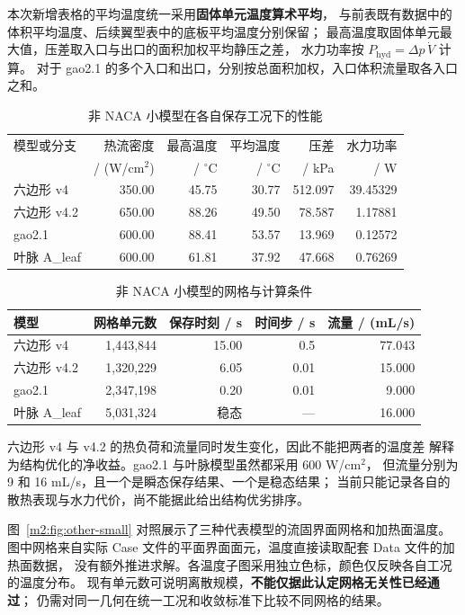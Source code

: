 \documentclass[UTF8]{midterm}
\begin{document}
本次新增表格的平均温度统一采用\textbf{固体单元温度算术平均}，
与前表既有数据中的体积平均温度、后续翼型表中的底板平均温度分别保留；
最高温度取固体单元最大值，压差取入口与出口的面积加权平均静压之差，
水力功率按 $P_{\mathrm{hyd}}=\Delta p\,\dot V$ 计算。
对于 gao2.1 的多个入口和出口，分别按总面积加权，入口体积流量取各入口之和。
\begin{table}[!htbp]
\centering
\small
\caption{非 NACA 小模型在各自保存工况下的性能}
\label{m2:tab:other-small}
\begin{tabularx}{\textwidth}{@{}Y r r r r r@{}}
\toprule
{} 模型或分支 & 热流密度 & 最高温度 & 平均温度 & 压差 & 水力功率 \\
 & / (W/cm$^2$) & / $^\circ$C & / $^\circ$C & / kPa & / W \\
\midrule
六边形 v4 & 350.00 & 45.75 & 30.77 & 512.097 & 39.45329 \\
六边形 v4.2 & 650.00 & 88.26 & 49.50 & 78.587 & 1.17881 \\
gao2.1 & 600.00 & 88.41 & 53.57 & 13.969 & 0.12572 \\
叶脉 A\_leaf & 600.00 & 61.81 & 37.92 & 47.668 & 0.76269 \\
\bottomrule
\end{tabularx}
\end{table}

\begin{table}[!htbp]
\centering
\small
\caption{非 NACA 小模型的网格与计算条件}
\label{m2:tab:other-conditions}
\begin{tabularx}{\textwidth}{@{}Y r r r r@{}}
\toprule
{} 模型 & 网格单元数 & 保存时刻 / s & 时间步 / s & 流量 / (mL/s) \\
\midrule
六边形 v4 & 1,443,844 & 15.00 & 0.5 & 77.043 \\
六边形 v4.2 & 1,320,229 & 6.05 & 0.01 & 15.000 \\
gao2.1 & 2,347,198 & 0.20 & 0.01 & 9.000 \\
叶脉 A\_leaf & 5,031,324 & 稳态 & --- & 16.000 \\
\bottomrule
\end{tabularx}
\end{table}

六边形 v4 与 v4.2 的热负荷和流量同时发生变化，因此不能把两者的温度差
解释为结构优化的净收益。gao2.1 与叶脉模型虽然都采用 600 W/cm$^2$，
但流量分别为 9 和 16 mL/s，且一个是瞬态保存结果、一个是稳态结果；
当前只能记录各自的散热表现与水力代价，尚不能据此给出结构优劣排序。

图~\ref{m2:fig:other-small} 对照展示了三种代表模型的流固界面网格和加热面温度。
图中网格来自实际 Case 文件的平面界面面元，温度直接读取配套 Data 文件的加热面数据，
没有额外推进求解。各温度子图采用独立色标，颜色仅反映各自工况的温度分布。
现有单元数可说明离散规模，\textbf{不能仅据此认定网格无关性已经通过}；
仍需对同一几何在统一工况和收敛标准下比较不同网格的结果。
\end{document}

